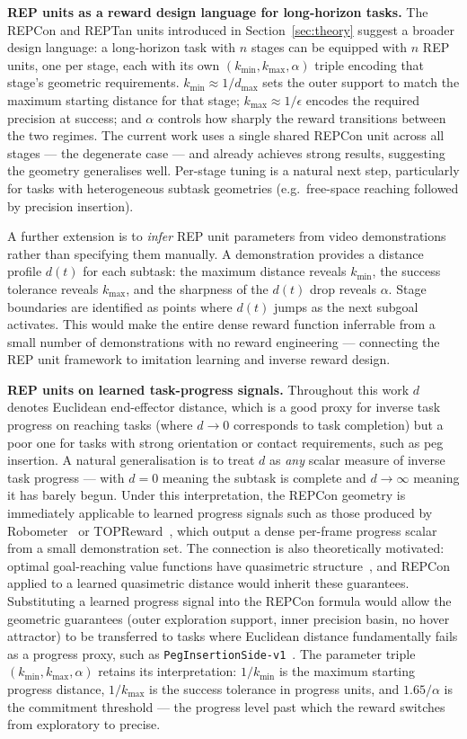 \documentclass{article}
\begin{document}
\textbf{REP units as a reward design language for long-horizon tasks.}
The REPCon and REPTan units introduced in Section~\ref{sec:theory} suggest a broader
design language: a long-horizon task with $n$ stages can be equipped with $n$ REP
units, one per stage, each with its own $(k_{\min}, k_{\max}, \alpha)$ triple encoding
that stage's geometric requirements. $k_{\min} \approx 1/d_{\max}$ sets the outer
support to match the maximum starting distance for that stage; $k_{\max} \approx
1/\epsilon$ encodes the required precision at success; and $\alpha$ controls how
sharply the reward transitions between the two regimes. The current work uses a single
shared REPCon unit across all stages --- the degenerate case --- and already achieves
strong results, suggesting the geometry generalises well. Per-stage tuning is a natural
next step, particularly for tasks with heterogeneous subtask geometries (e.g.\
free-space reaching followed by precision insertion).

A further extension is to \emph{infer} REP unit parameters from video demonstrations
rather than specifying them manually. A demonstration provides a distance profile
$d(t)$ for each subtask: the maximum distance reveals $k_{\min}$, the success
tolerance reveals $k_{\max}$, and the sharpness of the $d(t)$ drop reveals $\alpha$.
Stage boundaries are identified as points where $d(t)$ jumps as the next subgoal
activates. This would make the entire dense reward function inferrable from a small
number of demonstrations with no reward engineering --- connecting the REP unit
framework to imitation learning and inverse reward design.

\textbf{REP units on learned task-progress signals.}
Throughout this work $d$ denotes Euclidean end-effector distance, which is a good
proxy for inverse task progress on reaching tasks (where $d \to 0$ corresponds to
task completion) but a poor one for tasks with strong orientation or contact
requirements, such as peg insertion. A natural generalisation is to treat $d$ as
\emph{any} scalar measure of inverse task progress --- with $d=0$ meaning the
subtask is complete and $d \to \infty$ meaning it has barely begun. Under this
interpretation, the REPCon geometry is immediately applicable to learned progress
signals such as those produced by Robometer~\citep{liang2026robometer} or TOPReward~\citep{chen2026topreward}, which output a
dense per-frame progress scalar from a small demonstration set.
The connection is also theoretically motivated: optimal goal-reaching value functions
have quasimetric structure~\citep{wang2023quasimetric}, and REPCon applied to a learned
quasimetric distance would inherit these guarantees.
Substituting a learned progress signal into the REPCon formula would allow the geometric
guarantees (outer exploration support, inner precision basin, no hover attractor) to be
transferred to tasks where Euclidean distance fundamentally fails as a progress
proxy, such as \texttt{PegInsertionSide-v1}~\citep{wu2021learning}. The parameter triple
$(k_{\min}, k_{\max}, \alpha)$ retains its interpretation: $1/k_{\min}$ is the
maximum starting progress distance, $1/k_{\max}$ is the success tolerance in
progress units, and $1.65/\alpha$ is the commitment threshold --- the progress level
past which the reward switches from exploratory to precise.
\end{document}
